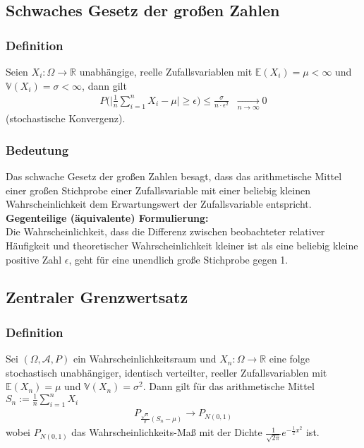 \documentclass[a4paper]{article}
\begin{document}
\subsection{Schwaches Gesetz der großen Zahlen}

\subsubsection{Definition}
Seien $X_i : \Omega \to \mathbb{R}$ unabhängige, reelle Zufallsvariablen mit $\mathbb{E}(X_i) = \mu < \infty$ und $\mathbb{V}(X_i) = \sigma < \infty$, dann gilt
\begin{align*}
P \bigl  ( \bigl | \frac{1}{n} \sum_{i=1}^{n} X_i - \mu \bigr |  \geq \epsilon \bigr) \leq \frac{\sigma}{ n \cdot \epsilon^2} \; \; \underset{n \to \infty}{\longrightarrow} 0
\end{align*}
(stochastische Konvergenz). 

\subsubsection{Bedeutung}
Das schwache Gesetz der großen Zahlen besagt, dass das arithmetische Mittel einer großen Stichprobe einer Zufallsvariable mit einer beliebig kleinen Wahrscheinlichkeit dem Erwartungswert der Zufallsvariable entspricht.\\

\textbf{Gegenteilige (äquivalente) Formulierung:}\\
Die Wahrscheinlichkeit, dass die Differenz zwischen beobachteter relativer Häufigkeit und theoretischer Wahrscheinlichkeit kleiner ist als eine beliebig kleine positive Zahl $\epsilon$, geht für eine unendlich große Stichprobe gegen 1.


\subsection{Zentraler Grenzwertsatz}

\subsubsection{Definition}
Sei $(\Omega, \mathcal{A}, P)$ ein Wahrscheinlichkeitsraum und $X_n :  \Omega \to \mathbb{R}$  eine folge stochastisch unabhängiger, identisch verteilter, reeller Zufallsvariablen mit $\mathbb{E}(X_n) = \mu$ und $\mathbb{V}(X_n)= \sigma^2$. Dann gilt für das arithmetische Mittel $S_n:= \frac{1}{n} \sum_{i=1}^n X_i$
\begin{align*}
P_{ \frac{\sqrt{n}}{\sigma} (S_n-\mu)} \to P_{N(0,1)}
\end{align*}
wobei $ P_{N(0,1)}$ das Wahrscheinlichkeits-Maß mit der Dichte $ \frac {1}{ \sqrt{2\pi}}e^{- \frac {1}{2} x^2}$ ist.
\end{document}
